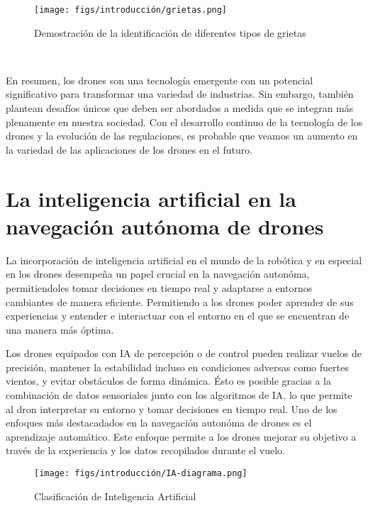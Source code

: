 \begin{figure} [H]
  \begin{center}
    \texttt{[image: figs/introducción/grietas.png]}
  \end{center}
  \caption{ Demostración de la identificación de diferentes tipos de grietas \cite{Deeplabv3}}
  \label{fig:Hidraulica}
\end{figure}\

En resumen, los drones son una tecnología emergente con un potencial significativo
para transformar una variedad de industrias. Sin embargo, también plantean desafíos únicos que deben ser abordados a medida que se integran más plenamente en nuestra
sociedad. Con el desarrollo continuo de la tecnología de los drones y la evolución de las
regulaciones, es probable que veamos un aumento en la variedad de las aplicaciones de
los drones en el futuro. 


\section{La inteligencia artificial en la navegación autónoma de drones}
\label{sec:IA}

La incorporación de inteligencia artificial en el mundo de la robótica y en especial en los drones desempeña un papel crucial en la navegación autonóma, permitiendoles tomar decisiones en tiempo real y adaptarse 
a entornos cambiantes de manera eficiente. Permitiendo a los drones poder aprender de sus experiencias y entender e interactuar con el entorno en el que se encuentran de una manera más
óptima. \newline

Los drones equipados con IA de percepción o de control pueden realizar vuelos de precisión, mantener la estabilidad incluso en condiciones adversas como fuertes vientos, y evitar obstáculos 
de forma dinámica. Ésto es posible gracias a la combinación de datos sensoriales junto con los algoritmos de IA, lo que permite 
al dron interpretar su entorno y tomar decisiones en tiempo real. Uno de los enfoques más destacadados en la navegación autonóma de drones es el aprendizaje automático. Este enfoque permite a los drones mejorar su objetivo a través de la experiencia 
y los datos recopilados durante el vuelo. 

\begin{figure} [H]
  \begin{center}
    \texttt{[image: figs/introducción/IA-diagrama.png]}
  \end{center}
  \caption{Clasificación de Inteligencia Artificial \cite{IA}}
  \label{fig:ClasificaciónIA}
\end{figure}
\newpage

